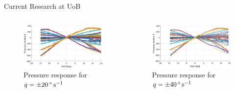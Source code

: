 \documentclass[aspectratio=169]{beamer}            %
\begin{document}
\begin{frame}{Current Research at UoB}

  \vspace{-1.5em}
	\begin{columns}
	  \begin{column}{0.5\textwidth}
		  \begin{figure}[!htb]
        \centering
			 \includegraphics[height=0.45\textwidth]{DistSens_PressureDynResponse_q20degps.eps}
			 \caption{Pressure response for ${q = \SI{\pm 20}{\degree\per\second}}$}
			 \label{fig:DistSens_PressureDynResponse_q20degps}
      \end{figure}
		\end{column}
    \begin{column}{0.5\textwidth}
      \begin{figure}[!htb]
        \centering
			 \includegraphics[height=0.45\textwidth]{DistSens_PressureDynResponse_q50degps.eps}
			 \caption{Pressure response for ${q = \SI{\pm 40}{\degree\per\second}}$}
			 \label{fig:DistSens_PressureDynResponse_q50degps}
      \end{figure}
		\end{column}
	\end{columns}

\end{frame}
\end{document}
